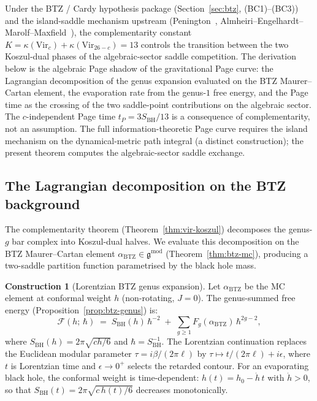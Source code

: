 \documentclass[11pt,reqno]{amsart}
\theoremstyle{definition}
\newtheorem{construction}[theorem]{Construction}
\theoremstyle{remark}
\begin{document}
Under the BTZ / Cardy hypothesis package
(Section~\ref{sec:btz}, (BC1)--(BC3)) and the island-saddle
mechanism upstream (Penington~\cite{Pen19},
Almheiri--Engelhardt--Marolf--Maxfield~\cite{AEMM19,AMMZ19}), the
complementarity constant $K = \kappa(\mathrm{Vir}_c)
+ \kappa(\mathrm{Vir}_{26-c}) = 13$ controls the transition
between the two Koszul-dual phases of the algebraic-sector
saddle competition. The derivation below is the algebraic Page
shadow of the gravitational Page curve: the Lagrangian
decomposition of the genus expansion evaluated on the BTZ
Maurer--Cartan element, the evaporation rate from the genus-$1$
free energy, and the Page time as the crossing of the two
saddle-point contributions on the algebraic sector. The
$c$-independent Page time $t_P = 3S_{\mathrm{BH}}/13$ is a
consequence of complementarity, not an assumption. The full
information-theoretic Page curve requires the island mechanism on
the dynamical-metric path integral (a distinct construction); the
present theorem computes the algebraic-sector saddle exchange.

\subsection{The Lagrangian decomposition on the BTZ background}

The complementarity theorem (Theorem~\ref{thm:vir-koszul})
decomposes the genus-$g$ bar complex into Koszul-dual halves.
We evaluate this decomposition on the BTZ Maurer--Cartan element
$\alpha_{\mathrm{BTZ}} \in \mathfrak{g}^{\mathrm{mod}}$
(Theorem~\ref{thm:btz-mc}), producing a two-saddle
partition function parametrised by the black hole mass.

\begin{construction}[Lorentzian BTZ genus expansion]
\label{con:lorentzian-btz}
Let $\alpha_{\mathrm{BTZ}}$ be the MC element at conformal weight
$h$ (non-rotating, $J = 0$). The genus-summed free energy
(Proposition~\ref{prop:btz-genus}) is:
\begin{equation}\label{eq:btz-genus-sum}
\mathcal{F}(h;\,\hbar)
\;=\;
S_{\mathrm{BH}}(h)\,\hbar^{-2}
\;+\;
\sum_{g \ge 1} F_g(\alpha_{\mathrm{BTZ}})\,
\hbar^{2g-2},
\end{equation}
where $S_{\mathrm{BH}}(h) = 2\pi\sqrt{ch/6}$ and
$\hbar = S_{\mathrm{BH}}^{-1}$.
The Lorentzian continuation replaces the Euclidean modular
parameter $\tau = i\beta/(2\pi\ell)$ by
$\tau \mapsto t/(2\pi\ell) + i\epsilon$, where $t$ is
Lorentzian time and $\epsilon \to 0^+$ selects the retarded
contour.
For an evaporating black hole, the conformal weight is
time-dependent: $h(t) = h_0 - \dot{h}\,t$ with
$\dot{h} > 0$, so that
$S_{\mathrm{BH}}(t) = 2\pi\sqrt{c\,h(t)/6}$ decreases
monotonically.
\end{construction}
\end{document}

